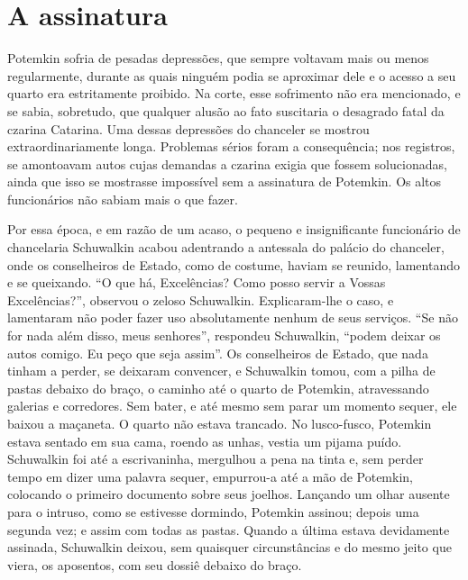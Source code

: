 \section{A assinatura }

Potemkin sofria de pesadas depressões, que sempre voltavam mais ou menos
regularmente, durante as quais ninguém podia se aproximar dele e o
acesso a seu quarto era estritamente proibido. Na corte, esse sofrimento
não era mencionado, e se sabia, sobretudo, que qualquer alusão ao fato
suscitaria o desagrado fatal da czarina Catarina. Uma dessas depressões
do chanceler se mostrou extraordinariamente longa. Problemas sérios
foram a consequência; nos registros, se amontoavam autos cujas demandas
a czarina exigia que fossem solucionadas, ainda que isso se mostrasse
impossível sem a assinatura de Potemkin. Os altos funcionários não
sabiam mais o que fazer.

Por essa época, e em razão de um acaso, o pequeno e insignificante
funcionário de chancelaria Schuwalkin acabou adentrando a antessala do
palácio do chanceler, onde os conselheiros de Estado, como de costume,
haviam se reunido, lamentando e se queixando. ``O que há, Excelências?
Como posso servir a Vossas Excelências?'', observou o zeloso Schuwalkin.
Explicaram-lhe o caso, e lamentaram não poder fazer uso absolutamente
nenhum de seus serviços. ``Se não for nada além disso, meus senhores'',
respondeu Schuwalkin, ``podem deixar os autos comigo. Eu peço que seja
assim''. Os conselheiros de Estado, que nada tinham a perder, se
deixaram convencer, e Schuwalkin tomou, com a pilha de pastas debaixo do
braço, o caminho até o quarto de Potemkin, atravessando galerias e
corredores. Sem bater, e até mesmo sem parar um momento sequer, ele
baixou a maçaneta. O quarto não estava trancado. No lusco-fusco,
Potemkin estava sentado em sua cama, roendo as unhas, vestia um pijama
puído. Schuwalkin foi até a escrivaninha, mergulhou a pena na tinta e,
sem perder tempo em dizer uma palavra sequer, empurrou-a até a mão de
Potemkin, colocando o primeiro documento sobre seus joelhos. Lançando um
olhar ausente para o intruso, como se estivesse dormindo, Potemkin
assinou; depois uma segunda vez; e assim com todas as pastas. Quando a
última estava devidamente assinada, Schuwalkin deixou, sem quaisquer
circunstâncias e do mesmo jeito que viera, os aposentos, com seu dossiê
debaixo do braço.

